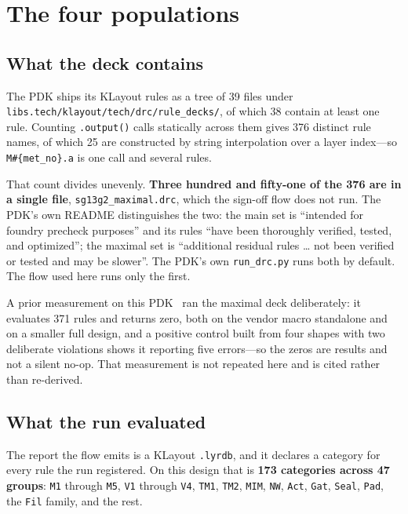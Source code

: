 \documentclass[11pt,a4paper]{article}
\newcommand{\file}[1]{\texttt{\small #1}}
\begin{document}
\section{The four populations}
\label{sec:accounting}

\subsection{What the deck contains}

The PDK ships its KLayout rules as a tree of \num{39} files under
\file{libs.tech/klayout/tech/drc/rule\_decks/}, of which \num{38}
contain at least one rule. Counting \texttt{.output()} calls statically
across them gives \num{376} distinct rule names, of which \num{25} are
constructed by string interpolation over a layer index---so
\texttt{M\#\{met\_no\}.a} is one call and several rules.

That count divides unevenly. \textbf{Three hundred and fifty-one of the
\num{376} are in a single file}, \file{sg13g2\_maximal.drc}, which the
sign-off flow does not run. The PDK's own README distinguishes the two:
the main set is ``intended for foundry precheck purposes'' and its rules
``have been thoroughly verified, tested, and optimized''; the maximal set
is ``additional residual rules \ldots{} not been verified or tested and
may be slower''. The PDK's own \file{run\_drc.py} runs both by default.
The flow used here runs only the first.

A prior measurement on this PDK~\cite{companion} ran the maximal deck
deliberately: it
evaluates \num{371} rules and returns zero, both on the vendor macro
standalone and on a smaller full design, and a positive control built
from four shapes with two deliberate violations shows it reporting five
errors---so the zeros are results and not a silent no-op. That
measurement is not repeated here and is cited rather than re-derived.

\subsection{What the run evaluated}

The report the flow emits is a KLayout \file{.lyrdb}, and it declares a
category for every rule the run registered. On this design that is
\textbf{\num{173} categories across \num{47} groups}: \texttt{M1} through
\texttt{M5}, \texttt{V1} through \texttt{V4}, \texttt{TM1}, \texttt{TM2},
\texttt{MIM}, \texttt{NW}, \texttt{Act}, \texttt{Gat}, \texttt{Seal},
\texttt{Pad}, the \texttt{Fil} family, and the rest.
\end{document}
